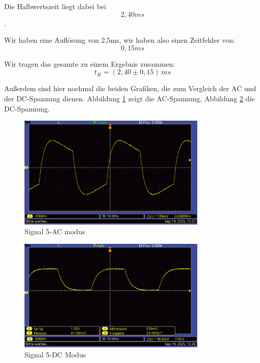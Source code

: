 Die Halbwertszeit liegt dabei bei 
\begin{equation}
    2,40 ms
\end{equation}.

Wir haben eine Auflösung von 2,5ms, wir haben also einen Zeitfehler von:
\begin{equation}
    0,15 ms
\end{equation}

Wir tragen das gesamte zu einem Ergebnis zusammen:
\begin{equation}
\boxed{
    t_H = (2,40 \pm 0,15)\, ms
}
\end{equation}


Außerdem sind hier nochmal die beiden Grafiken, die zum Vergleich der AC und der DC-Spannung dienen. Abbildung \ref{fig:sig5-ac} zeigt die AC-Spannung, Abbildung \ref{fig:sig5-dc} die DC-Spannung.
\onecolumn
\begin{figure} [h!]
    \centering
        \includegraphics[width=0.8\textwidth]{img/25/Signale2/Signal5-AC.pdf}
    \caption{Signal 5-AC modus}
    \label{fig:sig5-ac}
\end{figure}

\begin{figure} [h!]
    \centering
        \includegraphics[width=0.8\textwidth]{img/25/Signale2/Signal5-DC.pdf}
    \caption{Signal 5-DC Modus}
    \label{fig:sig5-dc}
\end{figure}
\twocolumn

